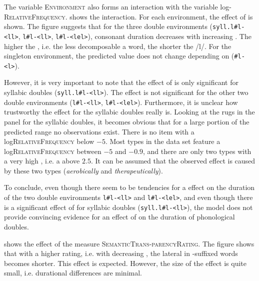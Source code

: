 The variable \textsc{Environment} also forms an interaction with the variable log- \textsc{RelativeFrequency}.  shows the interaction. For each environment, the effect of  is shown. 
The figure suggests that for the three double environments (\texttt{syll.l\#l- <ll>}, \texttt{l\#l-<ll>}, \texttt{l\#l-<lel>}), consonant duration decreases with increasing . The higher the , i.e. the less decomposable a word, the shorter the /l/. For the singleton environment, the predicted value does not change depending on  (\texttt{\#l-<l>}).




However, it is very important to note that the effect of  is only significant for syllabic doubles (\texttt{syll.l\#l-<ll>}).  The effect is not significant for the other two double environments (\texttt{l\#l-<ll>}, \texttt{l\#l-<lel>}). 
Furthermore, it is unclear how trustworthy the effect for the syllabic doubles really is. Looking at the rugs in the panel for the syllabic doubles, it becomes obvious that for a large portion of the predicted  range no observations exist. There is no item with a log\textsc{RelativeFrequency} below $-5$. 
Most types in the data set feature a log\textsc{RelativeFrequency} between $-5$ and $-0.9$, and there are only two types with a very high , i.e. a   above $2.5$. It can be assumed that the observed  effect is caused by these two types (\textit{aerobically} and \textit{therapeutically}). 


To conclude, even though there seem to be tendencies for a  effect on the duration of the two double environments  \texttt{l\#l-<ll>} and \texttt{l\#l-<lel>}, and even though there is a significant effect of  for syllabic doubles  (\texttt{syll.l\#l-<ll>}), the model does not provide convincing evidence for an effect of  on the duration of phonological doubles.







 shows the effect of the  measure \textsc{SemanticTrans-parencyRating}. The figure shows that with a higher rating, i.e. with decreasing , the lateral in -suffixed words becomes shorter. This effect is expected. However, the size of the effect is quite small, i.e. durational differences are minimal.



